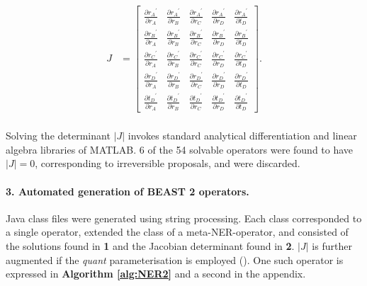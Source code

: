 \documentclass[10pt,letterpaper]{article}
\begin{document}
\begin{align}
	J &= \begin{bmatrix} \frac{\partial {r_A}^\prime}{\partial r_A} & \frac{\partial {r_A}^\prime}{\partial r_B} & \frac{\partial {r_A}^\prime}{\partial r_C} & \frac{\partial {r_A}^\prime}{\partial r_D} & \frac{\partial {r_A}^\prime}{\partial t_D} \\
	\frac{\partial {r_B}^\prime}{\partial r_A} & \frac{\partial {r_B}^\prime}{\partial r_B} & \frac{\partial {r_B}^\prime}{\partial r_C} & \frac{\partial {r_B}^\prime}{\partial r_D} & \frac{\partial {r_B}^\prime}{\partial t_D} \\
	\frac{\partial {r_C}^\prime}{\partial r_A} & \frac{\partial {r_C}^\prime}{\partial r_B} & \frac{\partial {r_C}^\prime}{\partial r_C} & \frac{\partial {r_C}^\prime}{\partial r_D} & \frac{\partial {r_C}^\prime}{\partial t_D} \\
	\frac{\partial {r_D}^\prime}{\partial r_A} & \frac{\partial {r_D}^\prime}{\partial r_B} & \frac{\partial {r_D}^\prime}{\partial r_C} & \frac{\partial {r_D}^\prime}{\partial r_D} & \frac{\partial {r_D}^\prime}{\partial t_D} \\
\frac{\partial {t_D}^\prime}{\partial r_A} & \frac{\partial {t_D}^\prime}{\partial r_B} & \frac{\partial {t_D}^\prime}{\partial r_C} & \frac{\partial {t_D}^\prime}{\partial r_D} & \frac{\partial {t_D}^\prime}{\partial t_D}\end{bmatrix}.  \nonumber  \\
\end{align}


Solving the determinant $|J|$ invokes standard analytical differentiation and linear algebra libraries of MATLAB. 
6 of the 54 solvable operators were found to have $|J|=0$, corresponding to irreversible proposals, and were discarded. 


\paragraph{3. Automated generation of BEAST 2 operators.} Java class files were generated using string processing. 
Each class corresponded to a single operator, extended the class of a meta-NER-operator, and consisted of the solutions found in \textbf{1} and the Jacobian determinant found in \textbf{2}. 
$|J|$ is further augmented if the \textit{quant} parameterisation is employed (\textbf{}).
One such operator is expressed in \textbf{Algorithm \ref{alg:NER2}} and a second in the appendix.
\end{document}
